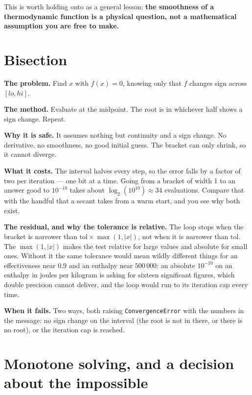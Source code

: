 \documentclass[11pt,a4paper]{report}
\newcommand{\code}[1]{\texttt{\small #1}}
\begin{document}
This is worth holding onto as a general lesson: \textbf{the smoothness of
a thermodynamic function is a physical question, not a mathematical
assumption you are free to make.}

\section{Bisection}

\textbf{The problem.} Find $x$ with $f(x) = 0$, knowing only that $f$
changes sign across $[lo, hi]$.

\textbf{The method.} Evaluate at the midpoint. The root is in whichever
half shows a sign change. Repeat.

\textbf{Why it is safe.} It assumes nothing but continuity and a sign
change. No derivative, no smoothness, no good initial guess. The bracket
can only shrink, so it cannot diverge.

\textbf{What it costs.} The interval halves every step, so the error falls
by a factor of two per iteration --- one bit at a time. Going from a
bracket of width 1 to an answer good to $10^{-10}$ takes about
$\log_2(10^{10}) \approx 34$ evaluations. Compare that with the handful
that a secant takes from a warm start, and you see why both exist.


\textbf{The residual, and why the tolerance is relative.} The loop stops
when the bracket is narrower than
$\mathrm{tol} \times \max(1, |x|)$, not when it is narrower than
$\mathrm{tol}$. The $\max(1, |x|)$ makes the test relative for large
values and absolute for small ones. Without it the same tolerance would
mean wildly different things for an effectiveness near $0.9$ and an
enthalpy near $500\,000$: an absolute $10^{-10}$ on an enthalpy in joules
per kilogram is asking for sixteen significant figures, which double
precision cannot deliver, and the loop would run to its iteration cap
every time.

\textbf{When it fails.} Two ways, both raising \code{ConvergenceError}
with the numbers in the message: no sign change on the interval (the root
is not in there, or there is no root), or the iteration cap is reached.

\section{Monotone solving, and a decision about the impossible}
\end{document}
